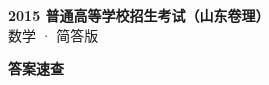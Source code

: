 \documentclass[zihao=-4, a4paper]{ctexart}
\begin{document}
\begin{center}
  {\Large\bfseries 2015 普通高等学校招生考试（山东卷理）}\\[4pt]
  {\large 数学 · 简答版}
\end{center}
\medskip
{}

\clearpage
{}
\begin{center}{\Large\bfseries 答案速查}\end{center}
\medskip

\end{document}
